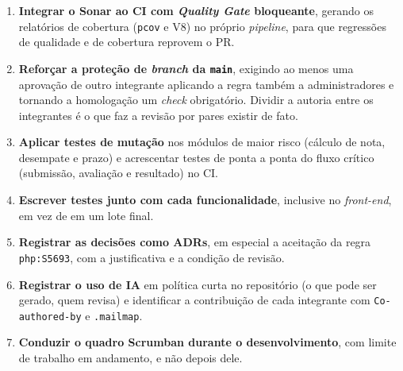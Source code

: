 \begin{enumerate}
  \item \textbf{Integrar o Sonar ao CI com \textit{Quality Gate} bloqueante}, gerando os relatórios de cobertura (\texttt{pcov} e V8) no próprio \textit{pipeline}, para que regressões de qualidade e de cobertura reprovem o PR.
  \item \textbf{Reforçar a proteção de \textit{branch} da \texttt{main}}, exigindo ao menos uma aprovação de outro integrante aplicando a regra também a administradores e tornando a homologação um \textit{check} obrigatório. Dividir a autoria entre os integrantes é o que faz a revisão por pares existir de fato.
  \item \textbf{Aplicar testes de mutação} nos módulos de maior risco (cálculo de nota, desempate e prazo) e acrescentar testes de ponta a ponta do fluxo crítico (submissão, avaliação e resultado) no CI.
  \item \textbf{Escrever testes junto com cada funcionalidade}, inclusive no \textit{front-end}, em vez de em um lote final.
  \item \textbf{Registrar as decisões como ADRs}, em especial a aceitação da regra \texttt{php:S5693}, com a justificativa e a condição de revisão.
  \item \textbf{Registrar o uso de IA} em política curta no repositório (o que pode ser gerado, quem revisa) e identificar a contribuição de cada integrante com \texttt{Co-authored-by} e \texttt{.mailmap}.
  \item \textbf{Conduzir o quadro Scrumban durante o desenvolvimento}, com limite de trabalho em andamento, e não depois dele.
\end{enumerate}
